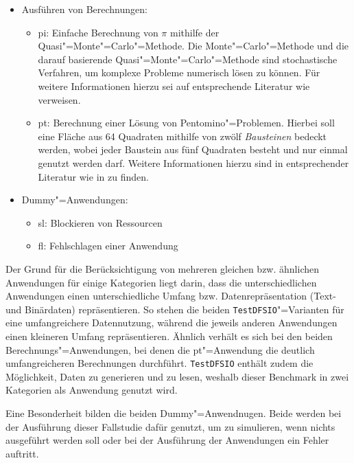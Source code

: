 \begin{itemize}
    \item Ausführen von Berechnungen:
    \begin{itemize}
        \item \acrlong{pi}: Einfache Berechnung von $\pi$ mithilfe der Quasi"=Monte"=Carlo"=Methode.
            Die Monte"=Carlo"=Methode und die darauf basierende Quasi"=Monte"=Carlo"=Methode sind stochastische Verfahren, um komplexe Probleme numerisch lösen zu können.
            Für weitere Informationen hierzu sei auf entsprechende Literatur wie \zB \cite{Korn2010,Lemieux2009} verweisen.
        \item \gls{pt}: Berechnung einer Lösung von Pentomino"=Problemen.
            Hierbei soll eine Fläche aus 64 Quadraten mithilfe von zwölf \emph{Bausteinen} bedeckt werden, wobei jeder Baustein aus fünf Quadraten besteht und nur einmal genutzt werden darf.
            Weitere Informationen hierzu sind in entsprechender Literatur wie \zB in \cite{Golomb1995} zu finden.
    \end{itemize}

    \item Dummy"=Anwendungen:
    \begin{itemize}
        \item  \gls{sl}: Blockieren von Ressourcen
        \item  \gls{fl}: Fehlschlagen einer Anwendung
    \end{itemize}
\end{itemize}

Der Grund für die Berücksichtigung von mehreren gleichen bzw. ähnlichen Anwendungen für einige Kategorien liegt darin, dass die unterschiedlichen Anwendungen einen unterschiedliche Umfang bzw. Datenrepräsentation (Text- und Binärdaten) repräsentieren.
So stehen die beiden \texttt{TestDFSIO}"=Varianten für eine umfangreichere Datennutzung, während die jeweils anderen Anwendungen einen kleineren Umfang repräsentieren.
Ähnlich verhält es sich bei den beiden Berechnungs"=Anwendungen, bei denen die \acrlong{pt}"=Anwendung die deutlich umfangreicheren Berechnungen durchführt.
\texttt{TestDFSIO} enthält zudem die Möglichkeit, Daten zu generieren und zu lesen, weshalb dieser Benchmark in zwei Kategorien als Anwendung genutzt wird.

Eine Besonderheit bilden die beiden Dummy"=Anwendnugen.
Beide werden bei der Ausführung dieser Fallstudie dafür genutzt, um zu simulieren, wenn nichts ausgeführt werden soll oder bei der Ausführung der Anwendungen ein Fehler auftritt.

